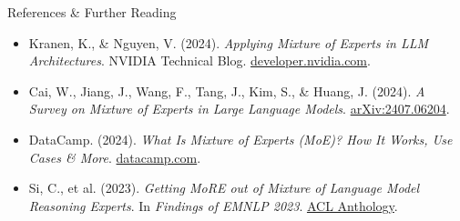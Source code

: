 \begin{frame}[allowframebreaks]{References \& Further Reading}
\begin{itemize}
\item Kranen, K., \& Nguyen, V. (2024). \emph{Applying Mixture of Experts in LLM Architectures}. NVIDIA Technical Blog. \href{https://developer.nvidia.com/blog/applying-mixture-of-experts-in-llm-architectures/}{developer.nvidia.com}.

\item Cai, W., Jiang, J., Wang, F., Tang, J., Kim, S., \& Huang, J. (2024). \emph{A Survey on Mixture of Experts in Large Language Models}. \href{https://arxiv.org/abs/2407.06204}{arXiv:2407.06204}.

\item DataCamp. (2024). \emph{What Is Mixture of Experts (MoE)? How It Works, Use Cases \& More}. \href{https://www.datacamp.com/blog/mixture-of-experts-moe}{datacamp.com}.

\item Si, C., et al. (2023). \emph{Getting MoRE out of Mixture of Language Model Reasoning Experts}. In \emph{Findings of EMNLP 2023}. \href{https://aclanthology.org/2023.findings-emnlp.552.pdf}{ACL Anthology}.
\end{itemize}
\end{frame}
